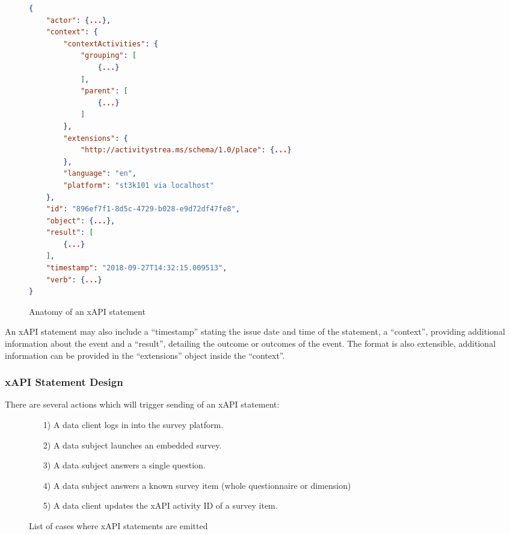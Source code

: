         \begin{figure}[H]
            \begin{lstlisting}[language=JSON]
{
    "actor": {...},
    "context": {
        "contextActivities": {
            "grouping": [
                {...}
            ],
            "parent": [
                {...}
            ]
        },
        "extensions": {
            "http://activitystrea.ms/schema/1.0/place": {...}
        },
        "language": "en",
        "platform": "st3k101 via localhost"
    },
    "id": "896ef7f1-8d5c-4729-b028-e9d72df47fe8",
    "object": {...},
    "result": [
        {...}
    ],
    "timestamp": "2018-09-27T14:32:15.009513",
    "verb": {...}
}

            \end{lstlisting}
            \caption{Anatomy of an xAPI statement}
            \label{fig:anatomy-xapi-statement}
        \end{figure}
    
    An xAPI statement may also include a ``timestamp'' stating the
    issue date and time of the statement, a ``context'', providing
    additional information about the event and a ``result'', detailing
    the outcome or outcomes of the event. The format is also extensible,
    additional information can be provided in the ``extensions''
    object inside the ``context''.

\subsubsection{xAPI Statement Design}
    There are several actions which will trigger sending of an
    xAPI statement:

    \begin{figure}[H]
        \begin{itemize}
            \item[1)] A data client logs in into the survey platform.
            \item[2)] A data subject launches an embedded survey.
            \item[3)] A data subject answers a single question.
            \item[4)] A data subject answers a known survey item (whole questionnaire or dimension)
            \item[5)] A data client updates the xAPI activity ID of a survey item.
        \end{itemize}
        \caption{List of cases where xAPI statements are emitted}
        \label{fig:xapi-statement-list}
    \end{figure}


